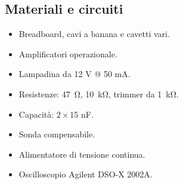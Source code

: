 \subsection{Materiali e circuiti}

\begin{itemize}
    \item{Breadboard, cavi a banana e cavetti vari.}
    \item{Amplificatori operazionale.}
    \item{Lampadina da 12 V @ 50 mA.}
    \item{Resistenze: \SI{47}{\ohm}, \SI{10}{\kilo\ohm}, trimmer da \SI{1}{\kilo\ohm}.}
    \item{Capacità: $2\times$15 nF.}
    \item{Sonda compensabile.}
    \item{Alimentatore di tensione continua.}
    \item{Oscilloscopio Agilent DSO-X 2002A.}
\end{itemize}
